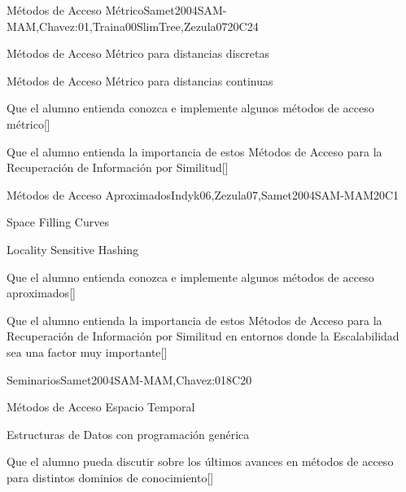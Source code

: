 \begin{syllabus}
\begin{unit}{Métodos de Acceso Métrico}{}{Samet2004SAM-MAM,Chavez:01,Traina00SlimTree,Zezula07}{20}{C24}
   \begin{topics}
         \item Métodos de Acceso Métrico para distancias discretas
         \item Métodos de Acceso Métrico para distancias continuas
   \end{topics}
   \begin{learningoutcomes}
         \item Que el alumno entienda conozca e implemente algunos métodos de acceso métrico[\Usage]
         \item Que el alumno entienda la importancia de estos Métodos de Acceso para la Recuperación de Información por Similitud[\Usage]
   \end{learningoutcomes}
\end{unit}

\begin{unit}{Métodos de Acceso Aproximados}{}{Indyk06,Zezula07,Samet2004SAM-MAM}{20}{C1}
   \begin{topics}
         \item Space Filling Curves
         \item Locality Sensitive Hashing
   \end{topics}
   \begin{learningoutcomes}
         \item Que el alumno entienda conozca e implemente algunos métodos de acceso aproximados[\Usage]
         \item Que el alumno entienda la importancia de estos Métodos de Acceso para la Recuperación de Información por Similitud en entornos donde la Escalabilidad sea una factor muy importante[\Usage]
   \end{learningoutcomes}
\end{unit}

\begin{unit}{Seminarios}{}{Samet2004SAM-MAM,Chavez:01}{8}{C20}
	\begin{topics}
         \item Métodos de Acceso Espacio Temporal
         \item Estructuras de Datos con programación genérica
   \end{topics}
   \begin{learningoutcomes}
         \item Que el alumno pueda discutir sobre los últimos avances en métodos de acceso para distintos dominios de conocimiento[\Usage]
   \end{learningoutcomes}
\end{unit}



\begin{coursebibliography}
\end{coursebibliography}

\end{syllabus}
